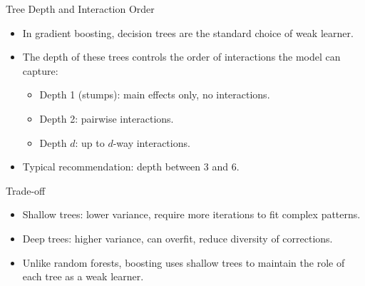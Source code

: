 \begin{frame}{Tree Depth and Interaction Order}
  \begin{itemize}
    \item In gradient boosting, \alert{decision trees} are the standard choice of weak learner.
    \item The depth of these trees controls the \alert{order of interactions} the model can capture:
      \begin{itemize}
        \item \alert{Depth 1 (stumps)}: main effects only, no interactions.
        \item \alert{Depth 2}: pairwise interactions.
        \item \alert{Depth $d$}: up to $d$-way interactions.
      \end{itemize}
    \item Typical recommendation: depth between \alert{3 and 6}.
  \end{itemize}
  \begin{block}{Trade-off}
    \begin{itemize}
      \item Shallow trees: lower variance, require more iterations to fit complex patterns.
      \item Deep trees: higher variance, can overfit, reduce diversity of corrections.
    \end{itemize}
  \end{block}
  \begin{itemize}
    \item Unlike random forests, boosting uses \alert{shallow trees} to maintain the role of
          each tree as a weak learner.
  \end{itemize}
\end{frame}

